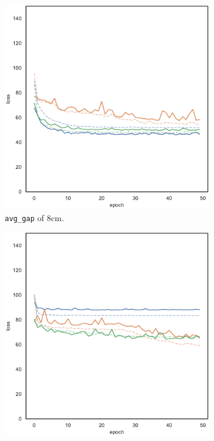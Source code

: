 \begin{figure}[!htb]
	\begin{center}
		\begin{subfigure}[h]{0.32\textwidth}
			\includegraphics[width=\textwidth]{contents/images/task1-comm/loss-distributed-gap_8@copy}
			\caption{\texttt{avg\_gap} of $8$\gls{cm}.}
		\end{subfigure}
		\hfill
		\begin{subfigure}[h]{0.32\textwidth}
			\includegraphics[width=\textwidth]{contents/images/task1-comm/loss-distributed-gap_13@copy}%

\end{subfigure}
\end{center}
\end{figure}
